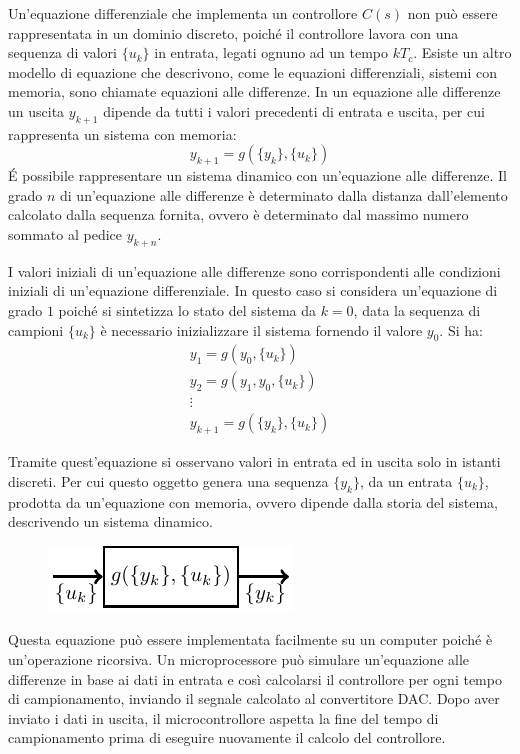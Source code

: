 \documentclass{article}
\numberwithin{equation}{subsection}
\begin{document}
Un'equazione differenziale che implementa un controllore $C(s)$ non può essere rappresentata in un dominio discreto, poiché il controllore lavora con una sequenza di valori 
$\{u_k\}$ in entrata, legati ognuno ad un tempo $kT_c$. Esiste un altro modello di equazione che descrivono, come le equazioni differenziali, sistemi con memoria, sono chiamate 
equazioni alle differenze. In un equazione alle differenze un uscita $y_{k+1}$ dipende da tutti i valori precedenti di entrata e uscita, per cui rappresenta un sistema con 
memoria: 
\begin{equation}
    y_{k+1}=g\left(\{y_k\},\{u_k\}\right)
\end{equation}
\'{E} possibile rappresentare un sistema dinamico con un'equazione alle differenze. Il grado $n$ di un'equazione alle differenze è determinato dalla distanza dall'elemento 
calcolato dalla sequenza fornita, ovvero è determinato dal massimo numero sommato al pedice $y_{k+n}$. 

I valori iniziali di un'equazione alle differenze sono corrispondenti alle condizioni iniziali di un'equazione differenziale. In questo caso si considera un'equazione di grado 
$1$ poiché si sintetizza lo stato del sistema da $k=0$, data la sequenza di campioni $\{u_k\}$ è necessario inizializzare il sistema fornendo il valore $y_0$. 
Si ha:
\begin{gather*}
    y_1=g(y_0,\{u_k\})\\
    y_2=g(y_1,y_0,\{u_k\})\\
    \vdots\\
    y_{k+1}=g(\{y_k\},\{u_k\})
\end{gather*}

Tramite 
quest'equazione si osservano valori in entrata ed in uscita solo in istanti discreti. Per cui questo oggetto genera una sequenza $\{y_k\}$, da un entrata $\{u_k\}$, prodotta 
da un'equazione con memoria, ovvero dipende dalla storia del sistema, descrivendo un sistema dinamico. 

\begin{figure}[H]%
    \centering
    \includegraphics{sistema-discreto.pdf}%
\end{figure}

Questa equazione può essere implementata facilmente su un computer poiché è un'operazione ricorsiva. Un microprocessore può simulare un'equazione alle differenze in base ai 
dati in entrata e così calcolarsi il controllore per ogni tempo di campionamento, inviando il segnale calcolato al convertitore DAC. Dopo aver inviato i dati in uscita, il 
microcontrollore aspetta la fine del tempo di campionamento prima di eseguire nuovamente il calcolo del controllore. 
\end{document}
